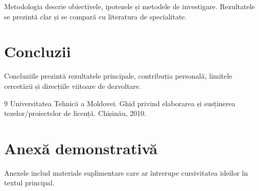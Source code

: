 \documentclass[thesis]{../shared/classes/utmreport}
\begin{document}
Metodologia descrie obiectivele, ipotezele și metodele de investigare. Rezultatele se prezintă clar și se compară cu literatura de specialitate.

\chapter{Concluzii}

Concluziile prezintă rezultatele principale, contribuția personală, limitele cercetării și direcțiile viitoare de dezvoltare.

\begin{thebibliography}{9}
 Universitatea Tehnică a Moldovei. Ghid privind elaborarea și susținerea tezelor/proiectelor de licență. Chișinău, 2010.
\end{thebibliography}

\appendix
\chapter{Anexă demonstrativă}

Anexele includ materiale suplimentare care ar întrerupe cursivitatea ideilor în textul principal.
\end{document}
